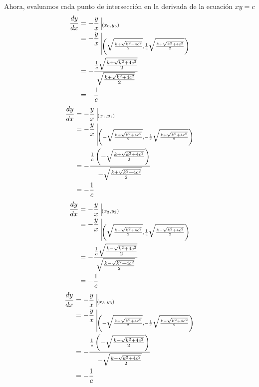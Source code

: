\documentclass[12pt]{article}
\begin{document}
Ahora, evaluamos cada punto de intersección en la derivada de la ecuación $xy=c$
\begin{equation*}
  \begin{split}
    \frac{dy}{dx}
    &= -\frac{y}{x} ~ \vline _{(x_0,y_o)}\\
    &=  -\frac{y}{x} ~ \vline _{\left(\sqrt{\frac{k+\sqrt{k^2+4c^2}}{2}}, \frac{1}{c}\sqrt{\frac{k+\sqrt{k^2+4c^2}}{2}}\right)}\\
    &= -\frac{\frac{1}{c}\sqrt{\frac{k+\sqrt{k^2+4c^2}}{2}}}{\sqrt{\frac{k+\sqrt{k^2+4c^2}}{2}}}\\
    &= -\frac{1}{c}\\
  \end{split}
\end{equation*}
\begin{equation*}
  \begin{split}
    \frac{dy}{dx}
    &= -\frac{y}{x} ~ \vline _{(x_1,y_1)}\\
    &=  -\frac{y}{x} ~ \vline _{\left(-\sqrt{\frac{k+\sqrt{k^2+4c^2}}{2}}, -\frac{1}{c}\sqrt{\frac{k+\sqrt{k^2+4c^2}}{2}}\right)}\\
    &= -\frac{\frac{1}{c}\left(-\sqrt{\frac{k+\sqrt{k^2+4c^2}}{2}}\right)}{-\sqrt{\frac{k+\sqrt{k^2+4c^2}}{2}}}\\
    &= -\frac{1}{c}\\
  \end{split}
\end{equation*}
\begin{equation*}
  \begin{split}
    \frac{dy}{dx}
    &= -\frac{y}{x} ~ \vline _{(x_2,y_2)}\\
    &=  -\frac{y}{x} ~ \vline _{\left(\sqrt{\frac{k-\sqrt{k^2+4c^2}}{2}}, \frac{1}{c}\sqrt{\frac{k-\sqrt{k^2+4c^2}}{2}}\right)}\\
    &= -\frac{\frac{1}{c}\sqrt{\frac{k-\sqrt{k^2+4c^2}}{2}}}{\sqrt{\frac{k-\sqrt{k^2+4c^2}}{2}}}\\
    &= -\frac{1}{c}\\
  \end{split}
\end{equation*}
\begin{equation*}
  \begin{split}
    \frac{dy}{dx}
    &= -\frac{y}{x} ~ \vline _{(x_3,y_3)}\\
    &=  -\frac{y}{x} ~ \vline _{\left(-\sqrt{\frac{k-\sqrt{k^2+4c^2}}{2}}, -\frac{1}{c}\sqrt{\frac{k-\sqrt{k^2+4c^2}}{2}}\right)}\\
    &= -\frac{\frac{1}{c}\left(-\sqrt{\frac{k-\sqrt{k^2+4c^2}}{2}}\right)}{-\sqrt{\frac{k-\sqrt{k^2+4c^2}}{2}}}\\
    &= -\frac{1}{c}\\
  \end{split}
\end{equation*}
\end{document}
